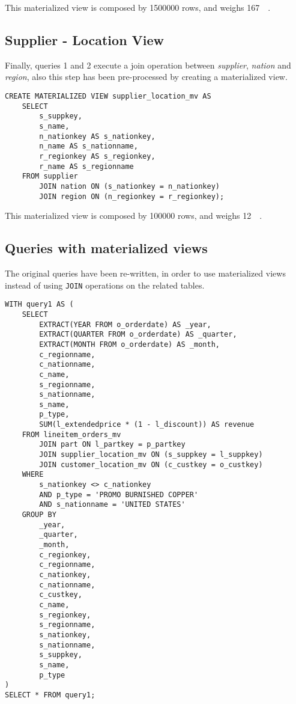 This materialized view is composed by \num{1500000} rows, and weighs \SI{167}{\mega\byte}.

\subsection{Supplier - Location View}
Finally, queries 1 and 2 execute a join operation between \textit{supplier}, \textit{nation} and \textit{region}, also this step has been pre-processed by creating a materialized view.

\begin{lstlisting}
CREATE MATERIALIZED VIEW supplier_location_mv AS
	SELECT 
		s_suppkey, 
		s_name, 
		n_nationkey AS s_nationkey, 
		n_name AS s_nationname, 
		r_regionkey AS s_regionkey, 
		r_name AS s_regionname 
	FROM supplier 
		JOIN nation ON (s_nationkey = n_nationkey)
		JOIN region ON (n_regionkey = r_regionkey);
\end{lstlisting}

This materialized view is composed by \num{100000} rows, and weighs \SI{12}{\mega\byte}.

\subsection{Queries with materialized views}
\label{subsection:queriesmaterilizedviews}

The original queries have been re-written, in order to use materialized views instead of using \texttt{JOIN} operations on the related tables.

\begin{lstlisting}
WITH query1 AS (
	SELECT
		EXTRACT(YEAR FROM o_orderdate) AS _year,
		EXTRACT(QUARTER FROM o_orderdate) AS _quarter,
		EXTRACT(MONTH FROM o_orderdate) AS _month,
		c_regionname,
		c_nationname,
		c_name,
		s_regionname,
		s_nationname,
		s_name,
		p_type,
		SUM(l_extendedprice * (1 - l_discount)) AS revenue
	FROM lineitem_orders_mv 
		JOIN part ON l_partkey = p_partkey
		JOIN supplier_location_mv ON (s_suppkey = l_suppkey)
		JOIN customer_location_mv ON (c_custkey = o_custkey)
	WHERE
		s_nationkey <> c_nationkey
		AND p_type = 'PROMO BURNISHED COPPER'
		AND s_nationname = 'UNITED STATES'
	GROUP BY
		_year,
		_quarter,
		_month,
		c_regionkey,
		c_regionname,
		c_nationkey,
		c_nationname,
		c_custkey,
		c_name,
		s_regionkey,
		s_regionname,
		s_nationkey,
		s_nationname,
		s_suppkey,
		s_name,
		p_type
)
SELECT * FROM query1;
\end{lstlisting}

